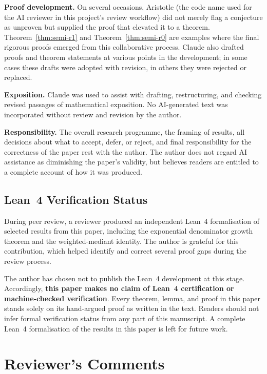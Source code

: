 \documentclass[12pt]{article}
\theoremstyle{definition}
\theoremstyle{remark}
\theoremstyle{plain}
\begin{document}
\textbf{Proof development.}
On several occasions, Aristotle (the code name used for the AI reviewer in
this project's review workflow) did not merely flag a conjecture as unproven
but supplied the proof that elevated it to a theorem.
Theorem~\ref{thm:semi-r1} and Theorem~\ref{thm:semi-r0} are examples where
the final rigorous proofs emerged from this collaborative process.
Claude also drafted proofs and theorem statements at various points in the
development; in some cases these drafts were adopted with revision, in others
they were rejected or replaced.

\textbf{Exposition.}
Claude was used to assist with drafting, restructuring, and checking revised
passages of mathematical exposition.
No AI-generated text was incorporated without review and revision by the author.

\textbf{Responsibility.}
The overall research programme, the framing of results, all decisions about
what to accept, defer, or reject, and final responsibility for the correctness
of the paper rest with the author.
The author does not regard AI assistance as diminishing the paper's validity,
but believes readers are entitled to a complete account of how it was produced.

\subsection*{Lean~4 Verification Status}

During peer review, a reviewer produced an independent Lean~4 formalisation
of selected results from this paper, including the exponential denominator
growth theorem and the weighted-mediant identity.
The author is grateful for this contribution, which helped identify and
correct several proof gaps during the review process.

The author has chosen not to publish the Lean~4 development at this stage.
Accordingly, \textbf{this paper makes no claim of Lean~4 certification or
machine-checked verification}.
Every theorem, lemma, and proof in this paper stands solely on its
hand-argued proof as written in the text.
Readers should not infer formal verification status from any part of this
manuscript.
A complete Lean~4 formalisation of the results in this paper is left for
future work.

\section*{Reviewer's Comments}
\label{sec:reviewers-comments}



\end{document}
